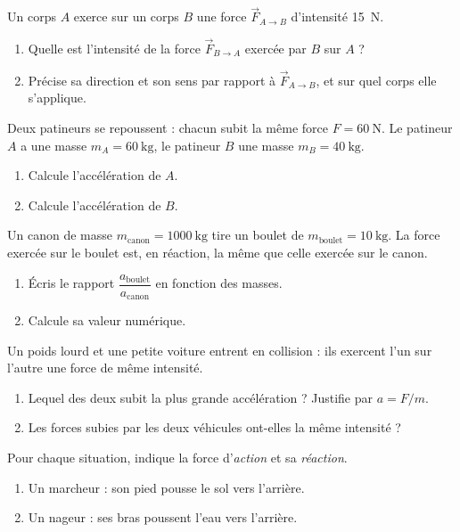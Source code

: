 \documentclass[11pt,a4paper]{article}
\newcommand{\vv}[1]{\vec{#1}}\newcommand{\ds}{\displaystyle}
\begin{document}

\begin{exo}
Un corps $A$ exerce sur un corps $B$ une force $\vv F_{A\to B}$ d'intensité \qty{15}{\newton}.
\begin{enumerate}[label=\alph*)]
  \item Quelle est l'intensité de la force $\vv F_{B\to A}$ exercée par $B$ sur $A$ ?
  \item Précise sa direction et son sens par rapport à $\vv F_{A\to B}$, et sur quel corps elle s'applique.
\end{enumerate}
\end{exo}

\begin{exo}
Deux patineurs se repoussent : chacun subit la même force $F=\qty{60}{\newton}$. Le patineur $A$ a une
masse $m_A=\qty{60}{\kilogram}$, le patineur $B$ une masse $m_B=\qty{40}{\kilogram}$.
\begin{enumerate}[label=\alph*)]
  \item Calcule l'accélération de $A$.
  \item Calcule l'accélération de $B$.
\end{enumerate}
\end{exo}

\begin{exo}
Un canon de masse $m_{\text{canon}}=\qty{1000}{\kilogram}$ tire un boulet de
$m_{\text{boulet}}=\qty{10}{\kilogram}$. La force exercée sur le boulet est, en réaction, la même que
celle exercée sur le canon.
\begin{enumerate}[label=\alph*)]
  \item Écris le rapport $\dfrac{a_{\text{boulet}}}{a_{\text{canon}}}$ en fonction des masses.
  \item Calcule sa valeur numérique.
\end{enumerate}
\end{exo}

\begin{exo}
Un poids lourd et une petite voiture entrent en collision : ils exercent l'un sur l'autre une force de
même intensité.
\begin{enumerate}[label=\alph*)]
  \item Lequel des deux subit la plus grande accélération ? Justifie par $a=F/m$.
  \item Les forces subies par les deux véhicules ont-elles la même intensité ?
\end{enumerate}
\end{exo}

\begin{exo}
Pour chaque situation, indique la force d'\emph{action} et sa \emph{réaction}.
\begin{enumerate}[label=\alph*)]
  \item Un marcheur : son pied pousse le sol vers l'arrière.
  \item Un nageur : ses bras poussent l'eau vers l'arrière.
\end{enumerate}
\end{exo}
\end{document}

